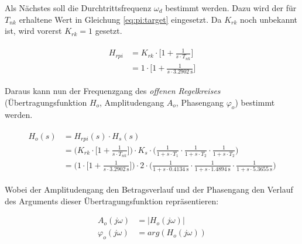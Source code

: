 Als N\"achstes  soll die Durchtrittsfrequenz $\omega_d$  bestimmt werden. Dazu
wird  der  f\"ur  $T_{nk}$  erhaltene  Wert  in  Gleichung  \ref{eq:pi:target}
eingesetzt. Da $K_{rk}$ noch unbekannt ist, wird vorerst $K_{rk} = 1$ gesetzt.

\begin{gather} \label{eq:pi:target}
    \begin{split}
        H_{rpi} & = K_{rk} \cdot \biggl[ 1 + \frac{1}{s \cdot T_{nk}} \biggr] \\
                & = 1      \cdot \biggl[ 1 + \frac{1}{s \cdot \SI{3.2902}{\second}} \biggr]
    \end{split}
\end{gather}

Daraus   kann   nun   der   Frequenzgang   des   {\em{offenen   Regelkreises}}
(\"Ubertragungsfunktion $H_o$,  Amplitudengang $A_o$,  Phasengang $\varphi_o$)
bestimmt werden.

\begin{gather} \label{eq:pi:h_open}
    \begin{split}
        H_o (s) & = H_{rpi} (s) \cdot H_s (s) \\
            & = \Biggl(
                    K_{rk} \cdot \biggl[ 1 + \frac{1}{s \cdot T_{nk}} \biggr]
                \Biggr)
                \cdot
                K_s
                \cdot
                \Biggl(
                        \frac{1}{1 + s \cdot T_1}
                  \cdot \frac{1}{1 + s \cdot T_2}
                  \cdot \frac{1}{1 + s \cdot T_2}
                \Biggr) \\
            & = \Biggl(
                    1 \cdot \biggl[ 1 + \frac{1}{s \cdot \SI{3.2902}{\second}} \biggr]
                \Biggr)
                \cdot
                2
                \cdot
                \Biggl(
                          \frac{1}{1 + s \cdot \SI{0.4134}{\second}}
                    \cdot \frac{1}{1 + s \cdot \SI{1.4894}{\second}}
                    \cdot \frac{1}{1 + s \cdot \SI{5.3655}{\second}}
                \Biggr)
    \end{split}
\end{gather}


Wobei der Amplitudengang den Betragsverlauf und der Phasengang den Verlauf des
Arguments dieser \"Ubertragungsfunktion repr\"asentieren:

\begin{equation}
    \begin{split} \label{eq:pi:a_o_phi_o}
        A_o(j\omega)       & = |H_o(j\omega)| \\
        \varphi_o(j\omega) & = arg(H_o(j\omega))
    \end{split}
\end{equation}

